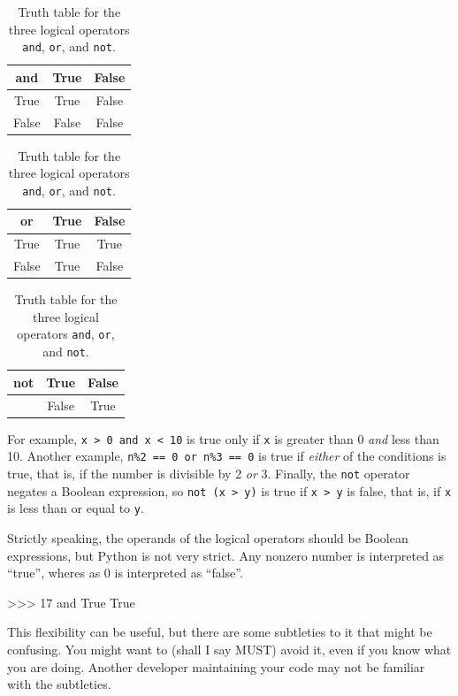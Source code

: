 \begin{table}[htb]
\begin{center}
\begin{minipage}[t]{.3\textwidth}
\begin{tabular}{|c|cc|}
\hline
and   & True  & False \\\hline
True  & True  & False \\
False & False & False \\\hline
\end{tabular}
\end{minipage}
%
\begin{minipage}[t]{.3\textwidth}
\begin{tabular}{|c|cc|}
\hline
or    & True  & False \\\hline
True  & True  & True  \\
False & True  & False \\\hline
\end{tabular}
\end{minipage}
%
\begin{minipage}[t]{.3\textwidth}
\begin{tabular}{|c|cc|}
\hline
not  & True  & False\\\hline
     & False & True \\\hline
\end{tabular}
\end{minipage}
%
\caption{Truth table for the three logical operators {\tt and}, {\tt or}, and {\tt not}.}
\label{tab:truth_table}
\end{center}
\end{table}

%

%
 For example, {\tt x > 0 and x < 10} is true only if {\tt x} is greater than 0
{\em and} less than 10. Another example, {\tt n\%2 == 0 or n\%3 == 0} is true if {\em either} of the conditions
is true, that is, if the number is divisible by 2 {\em or} 3.
%
Finally, the {\tt not} operator negates a Boolean
expression, so {\tt not (x > y)} is true if {\tt x > y} is false,
that is, if {\tt x} is less than or equal to {\tt y}.

\begin{remark}
Strictly speaking, the operands of the logical operators should be
Boolean expressions, but Python is not very strict.
Any nonzero number is interpreted as ``true'', wheres as 0 is interpreted as ``false''.

\beforeverb
\begin{pyinterpreter}
>>> 17 and True
True
\end{pyinterpreter}
\afterverb
%
This flexibility can be useful, but there are some subtleties to
it that might be confusing.  You might want to (shall I say MUST) avoid it, even if
you know what you are doing. Another developer maintaining your code may not be familiar with the subtleties.

\end{remark}


